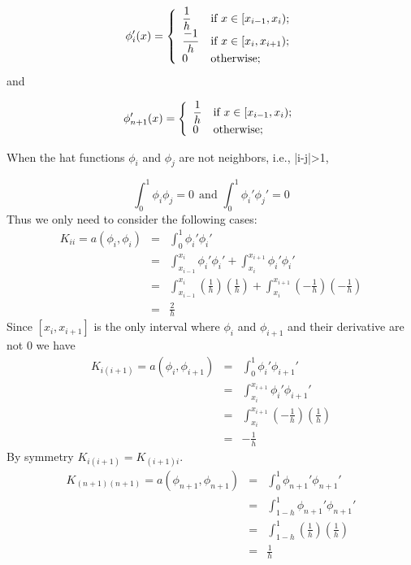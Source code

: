 {\begin{solution}
\begin{enumerate}
\[
\phi_i'(x) = \left\{
\begin{array}{ll}
\displaystyle{{1\over h}} & \mbox{if }x\in [x_{i-1}, x_i);\\
\displaystyle{{-1\over h}} & \mbox{if }x\in [x_i, x_{i+1});\\
0 & \mbox{otherwise};
\end{array}\right.
\]
and 

\[
\phi_{n+1}'(x) = \left\{
\begin{array}{ll}
\displaystyle{{1\over h}} & \mbox{if }x\in [x_{i-1}, x_i);\\
0 & \mbox{otherwise};
\end{array}\right.
\]

When the hat functions $\phi_i$ and $\phi_j$ are not neighbors, i.e., |i-j|>1, 

\[ \int_0^1 \phi_i \phi_j = 0 \:\: \mbox{and }  \int_0^1 \phi_i' \phi_j' = 0 \]
Thus we only need to consider the following cases:
\begin{eqnarray*}
K_{ii} = a(\phi_i, \phi_i) &=& \int_0^1 \phi_i' \phi_i'\\
												&=& \int_{x_{i-1}}^{x_i}  \phi_i' \phi_i' + \int_{x_{i}}^{x_{i+1}}  \phi_i' \phi_i'\\
												&=&\int_{x_{i-1}}^{x_i}  (\frac{1}{h}) (\frac{1}{h}) + \int_{x_{i}}^{x_{i+1}}  (-\frac{1}{h}) (-\frac{1}{h}) \\
												&=& \frac{2}{h}
\end{eqnarray*}
Since $[x_i, x_{i+1}]$ is the only interval where $\phi_i$ and $\phi_{i+1}$ and their derivative  are not $0$ we have 
\begin{eqnarray*}
K_{i(i+1)} = a(\phi_i, \phi_{i+1}) &=& \int_0^1 \phi_i' \phi_{i+1}'\\
												&=& \int_{x_{i}}^{x_{i+1}}  \phi_i' \phi_{i+1}'\\
												&=&\int_{x_{i}}^{x_{i+1}} (-\frac{1}{h}) (\frac{1}{h}) \\
												&=& -\frac{1}{h}
\end{eqnarray*}
By symmetry $K_{i(i+1)}= K_{(i+1)i}$.
\begin{eqnarray*}
K_{(n+1)(n+1)} = a(\phi_{n+1}, \phi_{n+1}) &=& \int_0^1 \phi_{n+1}' \phi_{n+1}'\\
												&=& \int_{1-h}^{1}  \phi_{n+1}' \phi_{n+1}'\\
												&=&\int_{1-h}^{1}  (\frac{1}{h}) (\frac{1}{h}) \\
												&=& \frac{1}{h}
\end{eqnarray*}


\end{enumerate}
\end{solution}}
